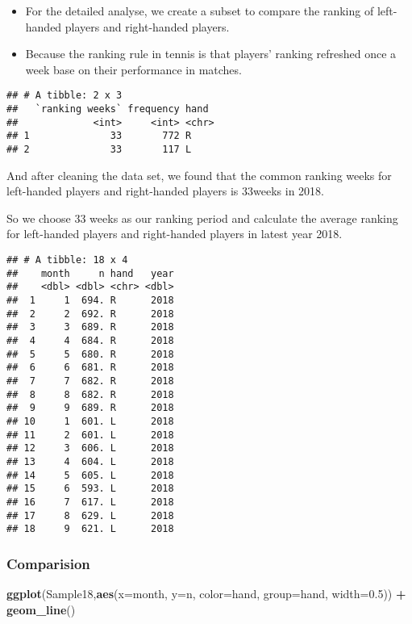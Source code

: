 \documentclass[]{article}
\newenvironment{Shaded}{\begin{snugshade}}{\end{snugshade}}
\newcommand{\KeywordTok}[1]{\textcolor[rgb]{0.13,0.29,0.53}{\textbf{#1}}}
\newcommand{\DataTypeTok}[1]{\textcolor[rgb]{0.13,0.29,0.53}{#1}}
\newcommand{\FloatTok}[1]{\textcolor[rgb]{0.00,0.00,0.81}{#1}}
\newcommand{\StringTok}[1]{\textcolor[rgb]{0.31,0.60,0.02}{#1}}
\newcommand{\OperatorTok}[1]{\textcolor[rgb]{0.81,0.36,0.00}{\textbf{#1}}}
\newcommand{\NormalTok}[1]{#1}
\providecommand{\tightlist}{%
  \setlength{\itemsep}{0pt}\setlength{\parskip}{0pt}}
\begin{document}
\begin{itemize}
\tightlist
\item
  For the detailed analyse, we create a subset to compare the ranking of
  left-handed players and right-handed players.
\item
  Because the ranking rule in tennis is that players' ranking refreshed
  once a week base on their performance in matches.
\end{itemize}

\begin{verbatim}
## # A tibble: 2 x 3
##   `ranking weeks` frequency hand 
##             <int>     <int> <chr>
## 1              33       772 R    
## 2              33       117 L
\end{verbatim}

And after cleaning the data set, we found that the common ranking weeks
for left-handed players and right-handed players is 33weeks in 2018.

So we choose 33 weeks as our ranking period and calculate the average
ranking for left-handed players and right-handed players in latest year
2018.

\begin{verbatim}
## # A tibble: 18 x 4
##    month     n hand   year
##    <dbl> <dbl> <chr> <dbl>
##  1     1  694. R      2018
##  2     2  692. R      2018
##  3     3  689. R      2018
##  4     4  684. R      2018
##  5     5  680. R      2018
##  6     6  681. R      2018
##  7     7  682. R      2018
##  8     8  682. R      2018
##  9     9  689. R      2018
## 10     1  601. L      2018
## 11     2  601. L      2018
## 12     3  606. L      2018
## 13     4  604. L      2018
## 14     5  605. L      2018
## 15     6  593. L      2018
## 16     7  617. L      2018
## 17     8  629. L      2018
## 18     9  621. L      2018
\end{verbatim}

\subsubsection{Comparision}\label{comparision}

\begin{Shaded}
\begin{Highlighting}[]
\KeywordTok{ggplot}\NormalTok{(Sample18,}\KeywordTok{aes}\NormalTok{(}\DataTypeTok{x=}\NormalTok{month, }\DataTypeTok{y=}\NormalTok{n, }\DataTypeTok{color=}\NormalTok{hand, }\DataTypeTok{group=}\NormalTok{hand, }\DataTypeTok{width=}\FloatTok{0.5}\NormalTok{)) }\OperatorTok{+}
\StringTok{  }\KeywordTok{geom_line}\NormalTok{() }
\end{Highlighting}
\end{Shaded}
\end{document}

